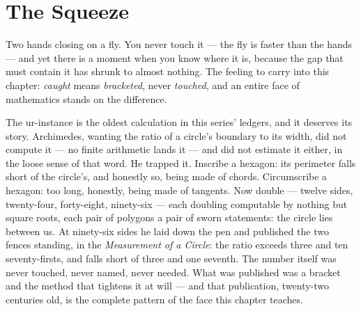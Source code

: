 \chapter{The Squeeze}

\begin{intuition}
Two hands closing on a fly. You never touch it --- the fly is faster
than the hands --- and yet there is a moment when you know where it is,
because the gap that must contain it has shrunk to almost nothing. The
feeling to carry into this chapter: \emph{caught} means \emph{bracketed},
never \emph{touched}, and an entire face of mathematics stands on the
difference.
\end{intuition}

The ur-instance is the oldest calculation in this series' ledgers, and
it deserves its story. Archimedes, wanting the ratio of a circle's
boundary to its width, did not compute it --- no finite arithmetic
lands it --- and did not estimate it either, in the loose sense of that
word. He trapped it. Inscribe a hexagon: its perimeter falls short of
the circle's, and honestly so, being made of chords. Circumscribe a
hexagon: too long, honestly, being made of tangents. Now double ---
twelve sides, twenty-four, forty-eight, ninety-six --- each doubling
computable by nothing but square roots, each pair of polygons a pair of
sworn statements: the circle lies between us. At ninety-six sides he
laid down the pen and published the two fences standing, in the
\emph{Measurement of a Circle}: the ratio exceeds three and ten
seventy-firsts, and falls short of three and one seventh. The number
itself was never touched, never named, never needed. What was published
was a bracket and the method that tightens it at will --- and that
publication, twenty-two centuries old, is the complete pattern of the
face this chapter teaches.

